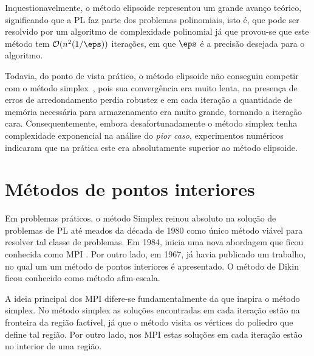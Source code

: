 Inquestionavelmente, o método elipsoide representou um grande avanço teórico,
significando que a \acl{PL} faz parte dos problemas polinomiais, isto é, que
pode ser resolvido por um algoritmo de complexidade polinomial já que provou-se
que este método tem $\mathcal{O}(n^2(1/\eps))$ iterações, em
que $\eps$ é a precisão desejada para o algoritmo.

Todavia, do ponto de vista prático, o método elipsoide não conseguiu competir com o
método simplex~\cite{Bland:1981vn}, pois sua convergência era muito lenta, na
presença de erros de arredondamento perdia robustez e em cada iteração a
quantidade de memória necessária para armazenamento era muito grande, tornando a iteração cara.
Consequentemente, embora desafortunadamente o método simplex tenha complexidade
exponencial na análise do \emph{pior caso}, experimentos numéricos indicaram que
na prática este era absolutamente superior ao método elipsoide.


\section{Métodos de pontos interiores}



Em problemas práticos, o método Simplex reinou absoluto na solução de problemas
de \ac{PL} até meados da década de 1980 como único método viável para resolver
tal classe de problemas. Em 1984, \textcite{Karmarkar:1984cp} inicia uma nova
abordagem que ficou conhecida como
\acf{MPI} . Por outro lado,  em 1967,
\textcite{DIKIN:InterativeSol1967} já havia publicado um trabalho, no qual um 
 um método de pontos interiores é apresentado. O método de Dikin ficou
conhecido como método afim-escala.
      



A ideia principal dos \ac{MPI} difere-se fundamentalmente da que inspira o
método simplex. No método simplex as soluções encontradas em cada iteração estão
na fronteira da região factível, já que o método visita os vértices do poliedro
que define tal região. Por outro lado, nos \ac{MPI} estas soluções em cada
iteração estão no interior de uma região. 

